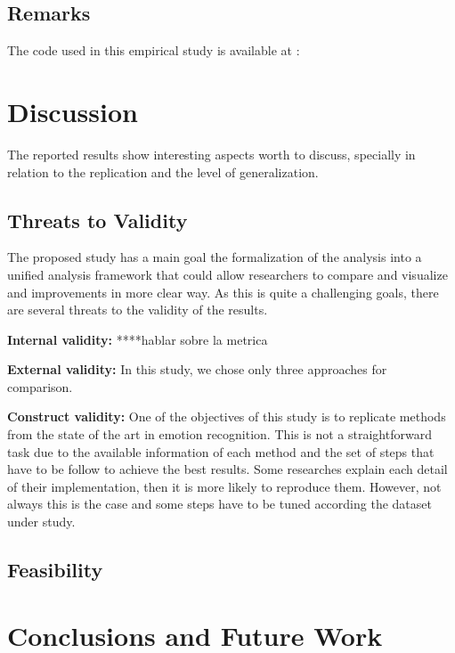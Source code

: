 \documentclass{sig-alternate}
\begin{document}
\subsection{Remarks}

The code used in this empirical study is available at : 

\section{Discussion}
\label{discussion}

The reported results show interesting aspects worth to discuss, specially 
in relation to the replication and the level of generalization.


\subsection{Threats to Validity}

The proposed  study has a main goal the formalization
of the analysis into a unified analysis framework 
that could allow researchers to compare and
visualize and improvements in more clear way. 
As this is quite a challenging goals, there are several
threats to the validity of the results. 

\textbf{Internal validity: }  ****hablar sobre la metrica

\textbf{External validity: } In this study, we chose only three approaches
for comparison. 

\textbf{Construct validity: } One of the objectives of this study is 
to replicate methods from the state of the art in emotion recognition.
This is not a straightforward task due to the available information of each method 
and the set of steps that have to be follow to achieve the best results.
Some researches explain each detail of their implementation, then it is more 
likely to reproduce them. However, not always this is the case and some steps 
have to be tuned according the dataset under study.    


\subsection{Feasibility}


\section{Conclusions and  Future Work}
\label{conclusion}
\end{document}
